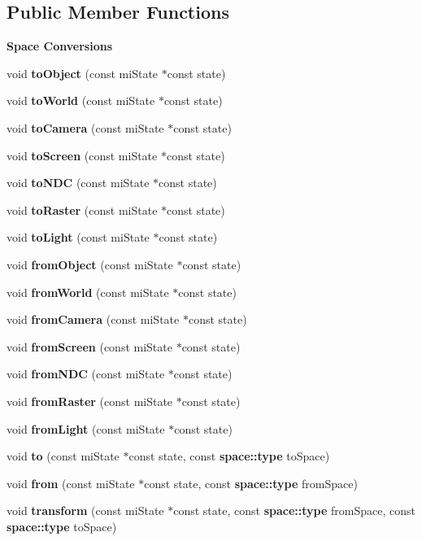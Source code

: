 \subsection*{Public Member Functions}
\begin{Indent}{\bf Space Conversions}\par
\begin{CompactItemize}
\item 
void {\bf to\-Object} (const mi\-State $\ast$const state)
\item 
void {\bf to\-World} (const mi\-State $\ast$const state)
\item 
void {\bf to\-Camera} (const mi\-State $\ast$const state)
\item 
void {\bf to\-Screen} (const mi\-State $\ast$const state)
\item 
void {\bf to\-NDC} (const mi\-State $\ast$const state)
\item 
void {\bf to\-Raster} (const mi\-State $\ast$const state)
\item 
void {\bf to\-Light} (const mi\-State $\ast$const state)
\item 
void {\bf from\-Object} (const mi\-State $\ast$const state)
\item 
void {\bf from\-World} (const mi\-State $\ast$const state)
\item 
void {\bf from\-Camera} (const mi\-State $\ast$const state)
\item 
void {\bf from\-Screen} (const mi\-State $\ast$const state)
\item 
void {\bf from\-NDC} (const mi\-State $\ast$const state)
\item 
void {\bf from\-Raster} (const mi\-State $\ast$const state)
\item 
void {\bf from\-Light} (const mi\-State $\ast$const state)
\item 
void {\bf to} (const mi\-State $\ast$const state, const {\bf space::type} to\-Space)
\item 
void {\bf from} (const mi\-State $\ast$const state, const {\bf space::type} from\-Space)
\item 
void {\bf transform} (const mi\-State $\ast$const state, const {\bf space::type} from\-Space, const {\bf space::type} to\-Space)
\end{CompactItemize}
\end{Indent}
